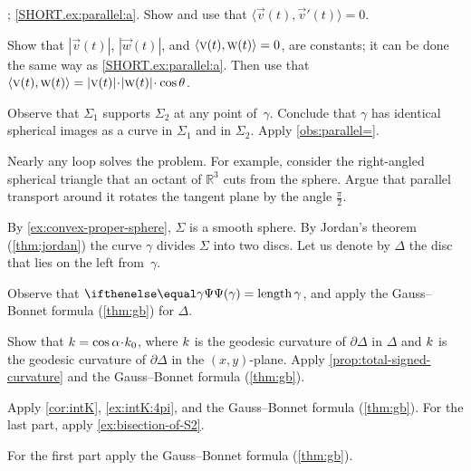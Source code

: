 \begin{multicols}{2}
 
\setcounter{eqtn}{0}

\parbf{\ref{ex:parallel}}; \ref{SHORT.ex:parallel:a}.
Show and use that $\langle\vec v(t),\vec v'(t)\rangle=0$.

\parit{\ref{SHORT.ex:parallel:b}}
Show that $|\vec v(t)|$, $|\vec w(t)|$, and
$\langle\vec v(t),\vec w(t)\rangle\z=0$,
are constants; it can be done the same way as \ref{SHORT.ex:parallel:a}.
Then use that 
$\langle\vec v(t),\vec w(t)\rangle\z=|\vec v(t)|\cdot|\vec w(t)|\cdot\cos\theta$.


\setcounter{eqtn}{0}

Observe that $\Sigma_1$ supports $\Sigma_2$ at any point of~$\gamma$.
Conclude that $\gamma$ has identical spherical images as a curve in $\Sigma_1$ and in $\Sigma_2$.
Apply \ref{obs:parallel=}.

Nearly any loop solves the problem.
For example, consider the right-angled spherical triangle that an octant of $\mathbb{R}^3$ cuts from the sphere.
Argue that parallel transport around it rotates the tangent plane by the angle $\tfrac\pi 2$. 

\setcounter{eqtn}{0}

By \ref{ex:convex-proper-sphere}, $\Sigma$ is a smooth sphere.
By Jordan's theorem (\ref{thm:jordan}) the curve $\gamma$ divides $\Sigma$ into two discs.
Let us denote by $\Delta$ the disc that lies on the left from~$\gamma$.

Observe that $\tgc\gamma=\length\gamma$, and apply the Gauss--Bonnet formula (\ref{thm:gb}) for $\Delta$.

Show that $\skur=\cos\alpha\cdot\skur_0$,
where $k$ is the geodesic curvature of $\partial \Delta$ in $\Delta$
and $k$ is the geodesic curvature of $\partial \Delta$ in the $(x,y)$-plane.
Apply \ref{prop:total-signed-curvature} and the Gauss--Bonnet formula (\ref{thm:gb}).

Apply \ref{cor:intK}, \ref{ex:intK:4pi}, and the Gauss--Bonnet formula (\ref{thm:gb}).
For the last part, apply \ref{ex:bisection-of-S2}.

 For the first part apply the Gauss--Bonnet formula (\ref{thm:gb}).


\end{multicols}
